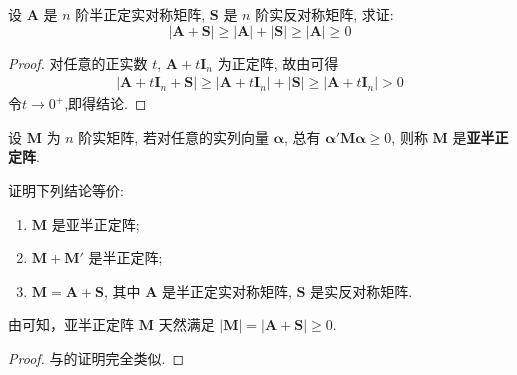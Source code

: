 \documentclass[../../main.tex]{subfiles}
\begin{document}
\begin{proposition}\label{proposition:半正定阵的行列式的相关的不等式}
设 \(\boldsymbol{A}\) 是 \(n\) 阶半正定实对称矩阵, \(\boldsymbol{S}\) 是 \(n\) 阶实反对称矩阵, 求证:
\[|\boldsymbol{A}+\boldsymbol{S}|\geq|\boldsymbol{A}|+|\boldsymbol{S}|\geq|\boldsymbol{A}|\geq0\]
\end{proposition}
\begin{proof}
对任意的正实数 \(t\), \(\boldsymbol{A}+t\boldsymbol{I}_n\) 为正定阵, 故由可得
\begin{align*}
|\boldsymbol{A}+t\boldsymbol{I}_n+\boldsymbol{S}|\geq|\boldsymbol{A}+t\boldsymbol{I}_n|+|\boldsymbol{S}|\geq|\boldsymbol{A}+t\boldsymbol{I}_n|>0
\end{align*}
令\(t\to0^+\),即得结论.
\end{proof}

\begin{definition}[亚半正定]
设 \(\boldsymbol{M}\) 为 \(n\) 阶实矩阵, 若对任意的实列向量 \(\boldsymbol{\alpha}\), 总有 \(\boldsymbol{\alpha}'\boldsymbol{M}\boldsymbol{\alpha}\geq0\), 则称 \(\boldsymbol{M}\) 是\textbf{亚半正定阵}. 
\end{definition}

\begin{theorem}\label{theorem:亚半正定阵的等价条件}
证明下列结论等价:
\begin{enumerate}[(1)]
\item \(\boldsymbol{M}\) 是亚半正定阵;
\item \(\boldsymbol{M}+\boldsymbol{M}'\) 是半正定阵;
\item \(\boldsymbol{M}=\boldsymbol{A}+\boldsymbol{S}\), 其中 \(\boldsymbol{A}\) 是半正定实对称矩阵, \(\boldsymbol{S}\) 是实反对称矩阵.
\end{enumerate} 
\end{theorem}
\begin{remark}
由可知，亚半正定阵 \(\boldsymbol{M}\) 天然满足 \(|\boldsymbol{M}| = |\boldsymbol{A}+\boldsymbol{S}|\geq0\).
\end{remark}
\begin{proof}
与的证明完全类似.
\end{proof}
\end{document}
